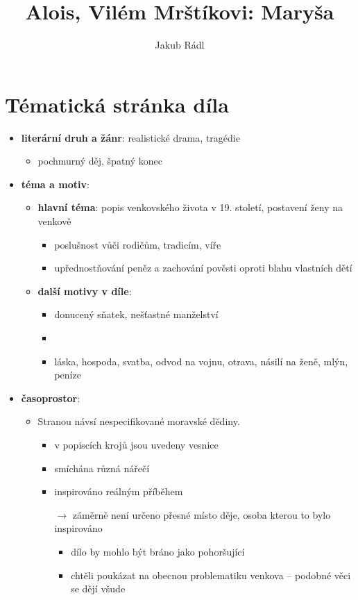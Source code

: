 \documentclass[10pt,a4paper]{article}
\date{}
\author{Jakub Rádl}
\title{Alois, Vilém Mrštíkovi: Maryša}
\newcommand{\ra}{$\rightarrow$ }
\begin{document}
\maketitle

\section*{Tématická stránka díla}
\begin{itemize}
\item \textbf{literární druh a žánr}: realistické drama, tragédie
	\begin{itemize}
	\item pochmurný děj, špatný konec
	\end{itemize}
\item \textbf{téma a motiv}: 
	\begin{itemize}
	\item \textbf{hlavní téma}: popis venkovského života v 19. století, postavení ženy na venkově
		\begin{itemize}
		\item poslušnost vůči rodičům, tradicím, víře
		\item upřednostňování peněz a zachování pověsti oproti blahu vlastních dětí
		\end{itemize}
	\item \textbf{další motivy v díle}:
		\begin{itemize}
		\item donucený sňatek, nešťastné manželství
		\item 
		\item láska, hospoda, svatba, odvod na vojnu, otrava, násilí na ženě, mlýn, peníze
		\end{itemize}
	\end{itemize}
\item \textbf{časoprostor}:
	\begin{itemize}
	\item Stranou návsí nespecifikované moravské dědiny.
		\begin{itemize}
		\item v popiscích krojů jsou uvedeny vesnice
		\item smíchána různá nářečí
		\item inspirováno reálným příběhem
		\item[\ra] záměrně není určeno přesné místo děje, osoba kterou to bylo inspirováno
			\begin{itemize}
			\item dílo by mohlo být bráno jako pohoršující
			\item chtěli poukázat na obecnou problematiku venkova -- podobné věci se dějí všude
			\end{itemize}
		

\end{itemize}
\end{itemize}
\end{itemize}
\end{document}
